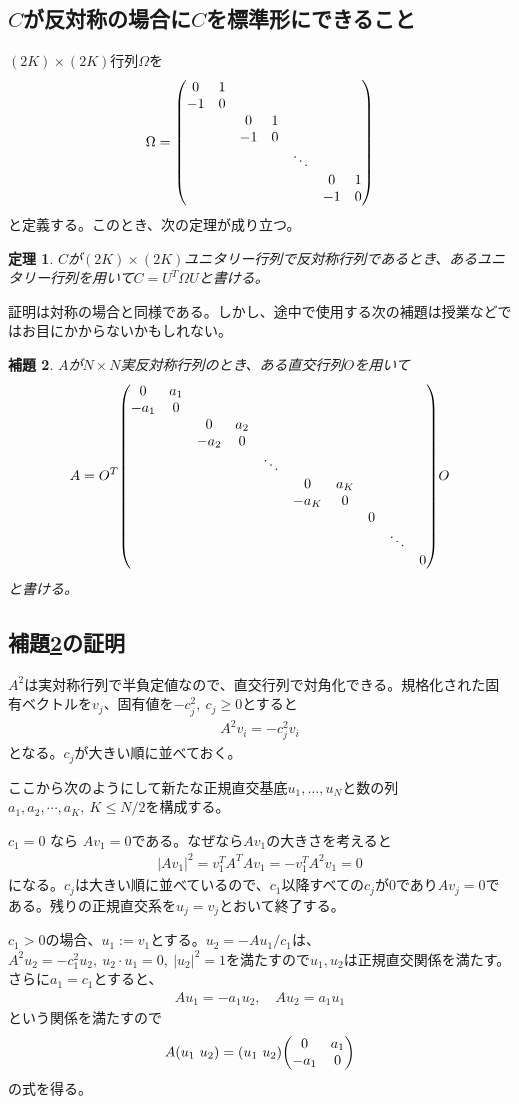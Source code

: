 \documentclass[12pt,a4paper,dvipdfmx]{jlreq}
\newtheorem{theo}{定理}
\newtheorem{lemma}[theo]{補題}
\begin{document}
\subsection{$C$が反対称の場合に$C$を標準形にできること}
$(2K)\times (2K)$行列$\Omega$を
\begin{align*}
  \Omega=
  \mqty(\dmat{0&1\\-1&0, 0&1\\-1&0,\ddots,0&1\\-1&0})
\end{align*}
と定義する。このとき、次の定理が成り立つ。
\begin{theo}
  $C$が$(2K)\times (2K)$ユニタリー行列で反対称行列であるとき、あるユニタリー行列を用いて$C=U^T\Omega U$と書ける。
\end{theo}

証明は対称の場合と同様である。しかし、途中で使用する次の補題は授業などではお目にかからないかもしれない。
\begin{lemma}\label{lemma}
  $A$が$N\times N$実反対称行列のとき、ある直交行列$O$を用いて
  \begin{align*}
    A=O^T 
    \mqty(\dmat{0&a_1\\-a_1&0, 0&a_2\\-a_2&0,\ddots,0&a_K\\-a_K&0, 0, \ddots,0})O
  \end{align*}
  と書ける。
\end{lemma}

\subsection{補題\ref{lemma}の証明}
$A^2$は実対称行列で半負定値なので、直交行列で対角化できる。規格化された固有ベクトルを$v_j$、固有値を$-c_j^2,\ c_j\ge 0$とすると
\begin{align*}
  A^2 v_i=-c_j^2v_i
\end{align*}
となる。$c_j$が大きい順に並べておく。

ここから次のようにして新たな正規直交基底$u_1,\dots,u_N$と数の列$a_1,a_2,\cdots,a_K,\ K\le N/2$を構成する。

$c_1=0$ なら
$Av_1=0$である。なぜなら$Av_1$の大きさを考えると
\begin{align*}
  |Av_1|^2=v_1^TA^TAv_1=-v_1^T A^2 v_1=0
\end{align*}
になる。$c_j$は大きい順に並べているので、$c_1$以降すべての$c_j$が0であり$Av_j=0$である。残りの正規直交系を$u_j=v_j$とおいて終了する。

$c_1 > 0$の場合、$u_1:=v_1$とする。$u_2=-A u_1/c_1$は、$A^2u_2=-c_1^2 u_2,\ u_2\cdot u_1=0,\ |u_2|^2=1$を満たすので$u_1,u_2$は正規直交関係を満たす。さらに$a_1=c_1$とすると、
\begin{align*}
  Au_1=-a_1u_2,\quad Au_2=a_1 u_1
\end{align*}
という関係を満たすので
\begin{align*}
  A(u_1 \ u_2)=(u_1\ u_2)\mqty(0&a_1\\-a_1&0)
\end{align*}
の式を得る。
\end{document}
